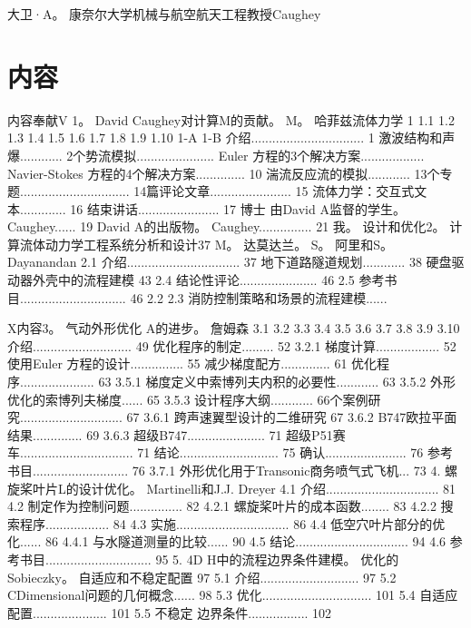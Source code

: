 \documentclass[UTF8,11pt,a4paper,openany,fontset=fandol]{ctexbook}
\begin{document}
大卫·A。 康奈尔大学机械与航空航天工程教授Caughey

\chapter*{内容}
内容奉献V 1。 David Caughey对计算M的贡献。 M。 哈菲兹流体力学 1 1.1 1.2 1.3 1.4 1.5 1.6 1.7 1.8 1.9 1.10 1-A 1-B 介绍................................ 1 激波结构和声爆............ 2个势流模拟...................... Euler 方程的3个解决方案.................. Navier-Stokes 方程的4个解决方案.............. 10 湍流反应流的模拟............ 13个专题............................... 14篇评论文章....................... 15 流体力学：交互式文本............. 16 结束讲话....................... 17 博士 由David A监督的学生。 Caughey...... 19 David A的出版物。 Caughey............... 21 我。 设计和优化2。 计算流体动力学工程系统分析和设计37 M。 达莫达兰。 S。 阿里和S。 Dayanandan 2.1 介绍................................ 37 地下道路隧道规划............ 38 硬盘驱动器外壳中的流程建模 43 2.4 结论性评论...................... 46 2.5 参考书目.............................. 46 2.2 2.3 消防控制策略和场景的流程建模......

X内容3。 气动外形优化 A的进步。 詹姆森 3.1 3.2 3.3 3.4 3.5 3.6 3.7 3.8 3.9 3.10 介绍............................ 49 优化程序的制定......... 52 3.2.1 梯度计算.................. 52 使用Euler 方程的设计............... 55 减少梯度配方.............. 61 优化程序..................... 63 3.5.1 梯度定义中索博列夫内积的必要性............ 63 3.5.2 外形优化的索博列夫梯度...... 65 3.5.3 设计程序大纲............ 66个案例研究............................. 67 3.6.1 跨声速翼型设计的二维研究 67 3.6.2 B747欧拉平面结果.............. 69 3.6.3 超级B747...................... 71 超级P51赛车................................ 71 结论............................ 75 确认....................... 76 参考书目........................... 76 3.7.1 外形优化用于Transonic商务喷气式飞机... 73 4. 螺旋桨叶片L的设计优化。 Martinelli和J.J. Dreyer 4.1 介绍................................ 81 4.2 制定作为控制问题............... 82 4.2.1 螺旋桨叶片的成本函数........ 83 4.2.2 搜索程序.................. 84 4.3 实施................................ 86 4.4 低空穴叶片部分的优化...... 86 4.4.1 与水隧道测量的比较...... 90 4.5 结论................................ 94 4.6 参考书目.............................. 95 5. 4D H中的流程边界条件建模。 优化的Sobieczky。 自适应和不稳定配置 97 5.1 介绍............................ 97 5.2 CDimensional问题的几何概念...... 98 5.3 优化............................... 101 5.4 自适应配置..................... 101 5.5 不稳定 边界条件................. 102
\end{document}
